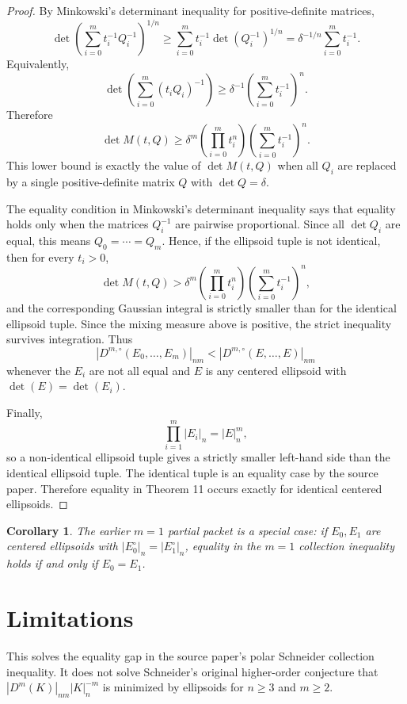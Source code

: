 \documentclass[11pt]{amsart}
\newtheorem{corollary}{Corollary}
\newcommand{\voln}[1]{|#1|_n}
\newcommand{\volnm}[1]{|#1|_{nm}}
\begin{document}
\begin{proof}
By Minkowski's determinant inequality for positive-definite matrices,
\[
 \det\left(\sum_{i=0}^m t_i^{-1}Q_i^{-1}\right)^{1/n}
 \geq
 \sum_{i=0}^m t_i^{-1}\det(Q_i^{-1})^{1/n}
 =
 \delta^{-1/n}\sum_{i=0}^m t_i^{-1}.
\]
Equivalently,
\[
  \det\left(\sum_{i=0}^m(t_iQ_i)^{-1}\right)
  \geq
  \delta^{-1}\left(\sum_{i=0}^m t_i^{-1}\right)^n.
\]
Therefore
\[
  \det M(t,Q)
  \geq
  \delta^m\left(\prod_{i=0}^m t_i^n\right)
  \left(\sum_{i=0}^m t_i^{-1}\right)^n.
\]
This lower bound is exactly the value of \(\det M(t,Q)\) when all
\(Q_i\) are replaced by a single positive-definite matrix \(Q\) with
\(\det Q=\delta\).

The equality condition in Minkowski's determinant inequality says that equality
holds only when the matrices \(Q_i^{-1}\) are pairwise proportional.  Since all
\(\det Q_i\) are equal, this means \(Q_0=\cdots=Q_m\).  Hence, if the ellipsoid
tuple is not identical, then for every \(t_i>0\),
\[
  \det M(t,Q)
  >
  \delta^m\left(\prod_{i=0}^m t_i^n\right)
  \left(\sum_{i=0}^m t_i^{-1}\right)^n,
\]
and the corresponding Gaussian integral is strictly smaller than for the
identical ellipsoid tuple.  Since the mixing measure above is positive, the
strict inequality survives integration.  Thus
\[
  \volnm{D^{m,\circ}(E_0,\ldots,E_m)}
  <
  \volnm{D^{m,\circ}(E,\ldots,E)}
\]
whenever the \(E_i\) are not all equal and \(E\) is any centered ellipsoid with
\(\det(E)=\det(E_i)\).

Finally,
\[
  \prod_{i=1}^m\voln{E_i}=\voln{E}^m,
\]
so a non-identical ellipsoid tuple gives a strictly smaller left-hand side than
the identical ellipsoid tuple.  The identical tuple is an equality case by the
source paper.  Therefore equality in Theorem 11 occurs exactly for identical
centered ellipsoids.
\end{proof}

\begin{corollary}
The earlier \(m=1\) partial packet is a special case: if \(E_0,E_1\) are
centered ellipsoids with \(\voln{E_0^\circ}=\voln{E_1^\circ}\), equality in the
\(m=1\) collection inequality holds if and only if \(E_0=E_1\).
\end{corollary}

\section*{Limitations}

This solves the equality gap in the source paper's polar Schneider collection
inequality.  It does not solve Schneider's original higher-order conjecture
that \(\volnm{D^m(K)}\voln{K}^{-m}\) is minimized by ellipsoids for
\(n\geq3\) and \(m\geq2\).
\end{document}
